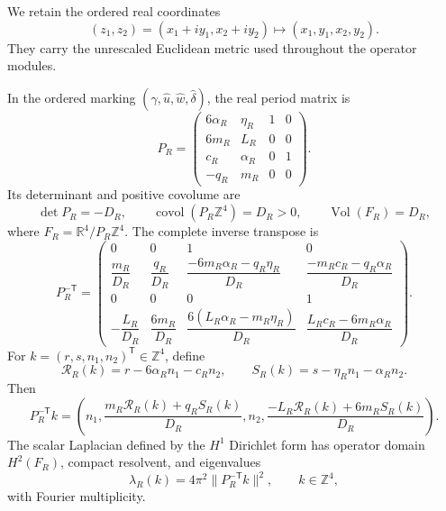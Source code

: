 We retain the ordered real coordinates
\begin{equation}
 (z_1,z_2)=(x_1+iy_1,x_2+iy_2)
 \longmapsto(x_1,y_1,x_2,y_2).
 \label{cusp-spec-real-coordinate-order}
\end{equation}
They carry the unrescaled Euclidean metric used throughout the operator
modules.

\begin{proposition}
\label{cusp-spec-exact-dual-lattice}
In the ordered marking
\((\widehat\gamma,\widehat u,\widehat w,\widehat\delta)\), the real period
matrix is
\begin{equation}
 P_R=
 \begin{pmatrix}
  6\alpha_R&\eta_R&1&0\\
  6m_R&L_R&0&0\\
  c_R&\alpha_R&0&1\\
  -q_R&m_R&0&0
 \end{pmatrix}.
 \label{cusp-spec-real-period-matrix}
\end{equation}
Its determinant and positive covolume are
\begin{equation}
 \det P_R=-D_R,\qquad
 \operatorname{covol}(P_R\mathbb Z^4)=D_R>0,
 \qquad
 \operatorname{Vol}(F_R)=D_R,
 \label{cusp-spec-exact-volume}
\end{equation}
where \(F_R=\mathbb R^4/P_R\mathbb Z^4\).  The complete inverse transpose is
\begin{equation}
 P_R^{-\mathsf T}=
 \begin{pmatrix}
 0&0&1&0\\[2pt]
 \dfrac{m_R}{D_R}&\dfrac{q_R}{D_R}&
 \dfrac{-6m_R\alpha_R-q_R\eta_R}{D_R}&
 \dfrac{-m_Rc_R-q_R\alpha_R}{D_R}\\[7pt]
 0&0&0&1\\[2pt]
 -\dfrac{L_R}{D_R}&\dfrac{6m_R}{D_R}&
 \dfrac{6(L_R\alpha_R-m_R\eta_R)}{D_R}&
 \dfrac{L_Rc_R-6m_R\alpha_R}{D_R}
 \end{pmatrix}.
 \label{cusp-spec-full-inverse-transpose}
\end{equation}
For \(k=(r,s,n_1,n_2)^{\mathsf T}\in\mathbb Z^4\), define
\begin{equation}
 \mathcal R_R(k)=r-6\alpha_Rn_1-c_Rn_2,
 \qquad
 S_R(k)=s-\eta_Rn_1-\alpha_Rn_2.
 \label{eq:current-shifted-indices}
\end{equation}
Then
\begin{equation}
 P_R^{-\mathsf T}k=
 \left(n_1,
 \frac{m_R\mathcal R_R(k)+q_RS_R(k)}{D_R},n_2,
 \frac{-L_R\mathcal R_R(k)+6m_RS_R(k)}{D_R}\right).
 \label{cusp-spec-exact-dual-lattice-formula}
\end{equation}
The scalar Laplacian defined by the \(H^1\) Dirichlet form has operator
domain \(H^2(F_R)\), compact resolvent, and eigenvalues
\begin{equation}
 \lambda_R(k)=4\pi^2\lVert P_R^{-\mathsf T}k\rVert^2,
 \qquad k\in\mathbb Z^4,
 \label{eq:current-scalar-spectrum}
\end{equation}
with Fourier multiplicity.


\end{proposition}
